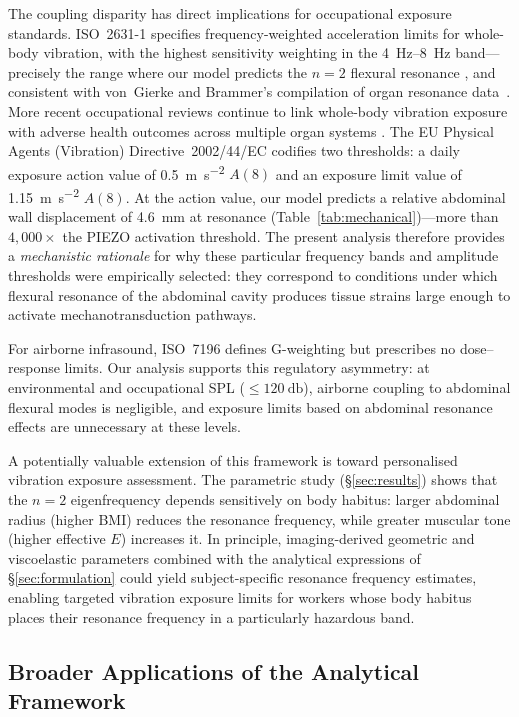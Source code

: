 The coupling disparity has direct implications for occupational exposure
standards.  ISO~2631-1 specifies frequency-weighted acceleration limits for
whole-body vibration, with the highest sensitivity weighting in the
\SIrange{4}{8}{\hertz} band---precisely the range where our model predicts
the $n = 2$ flexural resonance \cite{iso2631}, and consistent with
von~Gierke and Brammer's compilation of organ resonance
data~\cite{vonGierke2002}.  More recent occupational reviews continue to link
whole-body vibration exposure with adverse health outcomes across multiple
organ systems \cite{Krajnak2018}.  The EU Physical Agents
(Vibration) Directive~2002/44/EC codifies two thresholds: a daily exposure
action value of \SI{0.5}{\metre\per\second\squared} $A(8)$ and an exposure
limit value of \SI{1.15}{\metre\per\second\squared} $A(8)$.  At the action
value, our model predicts a relative abdominal wall displacement of
\SI{4.6}{\milli\metre} at resonance (Table~\ref{tab:mechanical})---more than
$4{,}000\times$ the PIEZO activation threshold.  The present analysis
therefore provides a \emph{mechanistic rationale} for why these particular
frequency bands and amplitude thresholds were empirically selected: they
correspond to conditions under which flexural resonance of the abdominal
cavity produces tissue strains large enough to activate
mechanotransduction pathways.

For airborne infrasound, ISO~7196 defines G-weighting but prescribes no
dose--response limits.  Our analysis supports this regulatory asymmetry:
at environmental and occupational SPL ($\leq \SI{120}{\decibel}$), airborne
coupling to abdominal flexural modes is negligible, and exposure limits
based on abdominal resonance effects are unnecessary at these levels.

A potentially valuable extension of this framework is toward personalised
vibration exposure assessment.  The parametric study (\S\ref{sec:results})
shows that the $n = 2$ eigenfrequency depends sensitively on body habitus:
larger abdominal radius (higher BMI) reduces the resonance frequency, while
greater muscular tone (higher effective $E$) increases it.  In principle,
imaging-derived geometric and viscoelastic parameters \cite{Sack2023} combined with
the analytical expressions of \S\ref{sec:formulation} could yield
subject-specific resonance frequency estimates, enabling targeted vibration
exposure limits for workers whose body habitus places their resonance
frequency in a particularly hazardous band.

\subsection{Broader Applications of the Analytical Framework}
\label{sec:disc:broader}

